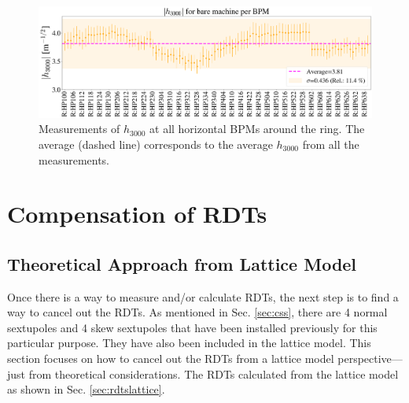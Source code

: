 \begin{figure}[H]
    \centering
    \includegraphics[width=\columnwidth]{chapter4/h3000_bpms.png}
    \caption{Measurements of $h_{3000}$ at all horizontal BPMs around the ring. The average (dashed line) corresponds to the average $h_{3000}$ from all the measurements.}
    \label{fig:h3000_bpms}
\end{figure}

\section{\label{sec:compensate}Compensation of RDTs}

\subsection{Theoretical Approach from Lattice Model}

Once there is a way to measure and/or calculate RDTs, the next step is to find a way to cancel out the RDTs. As mentioned in Sec. \ref{sec:css}, there are 4 normal sextupoles and 4 skew sextupoles that have been installed previously for this particular purpose. They have also been included in the lattice model. This section focuses on how to cancel out the RDTs from a lattice model perspective---just from theoretical considerations. The RDTs calculated from the lattice model as shown in Sec. \ref{sec:rdtslattice}.

